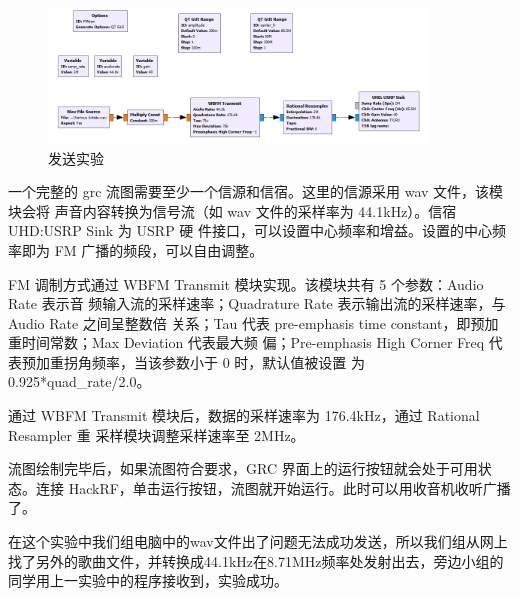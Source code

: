 \documentclass{../source/Experiment}
\begin{document}
\begin{figure}[H]
    \centering
    \includegraphics[width = 0.9\textwidth]{lab7/send.png}
    \caption{发送实验}
\end{figure}

一个完整的 grc 流图需要至少一个信源和信宿。这里的信源采用 wav 文件，该模块会将 声音内容转换为信号流（如 wav 文件的采样率为 44.1kHz）。信宿 UHD:USRP Sink 为 USRP 硬 件接口，可以设置中心频率和增益。设置的中心频率即为 FM 广播的频段，可以自由调整。

FM 调制方式通过 WBFM Transmit 模块实现。该模块共有 5 个参数：Audio Rate 表示音 频输入流的采样速率；Quadrature Rate 表示输出流的采样速率，与 Audio Rate 之间呈整数倍 关系；Tau 代表 pre-emphasis time constant，即预加重时间常数；Max Deviation 代表最大频 偏；Pre-emphasis High Corner Freq 代表预加重拐角频率，当该参数小于 0 时，默认值被设置
为 0.925*quad\_rate/2.0。

通过 WBFM Transmit 模块后，数据的采样速率为 176.4kHz，通过 Rational Resampler 重 采样模块调整采样速率至 2MHz。

流图绘制完毕后，如果流图符合要求，GRC 界面上的运行按钮就会处于可用状态。连接 HackRF，单击运行按钮，流图就开始运行。此时可以用收音机收听广播了。

在这个实验中我们组电脑中的wav文件出了问题无法成功发送，所以我们组从网上找了另外的歌曲文件，并转换成44.1kHz在8.71MHz频率处发射出去，旁边小组的同学用上一实验中的程序接收到，实验成功。
\end{document}
